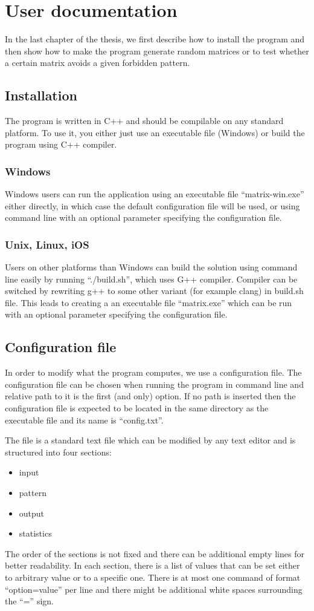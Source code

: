 \chapter{User documentation}
\label{chap:udoc}
In the last chapter of the thesis, we first describe how to install the program and then show how to make the program generate random matrices or to test whether a certain matrix avoids a given forbidden pattern.

\section{Installation}
The program is written in C++ and should be compilable on any standard platform. To use it, you either just use an executable file (Windows) or build the program using C++ compiler.

\subsection{Windows}
Windows users can run the application using an executable file ``matrix-win.exe'' either directly, in which case the default configuration file will be used, or using command line with an optional parameter specifying the configuration file.

\subsection{Unix, Linux, iOS}
Users on other platforms than Windows can build the solution using command line easily by running ``./build.sh'', which uses G++ compiler. Compiler can be switched by rewriting g++ to some other variant (for example clang) in build.sh file. This leads to creating a an executable file ``matrix.exe'' which can be run with an optional parameter specifying the configuration file.

\section{Configuration file}
In order to modify what the program computes, we use a configuration file. The configuration file can be chosen when running the program in command line and relative path to it is the first (and only) option. If no path is inserted then the configuration file is expected to be located in the same directory as the executable file and its name is ``config.txt''.

The file is a standard text file which can be modified by any text editor and is structured into four sections:
\begin{itemize}
\item input
\item pattern
\item output
\item statistics
\end{itemize}
The order of the sections is not fixed and there can be additional empty lines for better readability. In each section, there is a list of values that can be set either to arbitrary value or to a specific one. There is at most one command of format ``option=value'' per line and there might be additional white spaces surrounding the ``='' sign.

